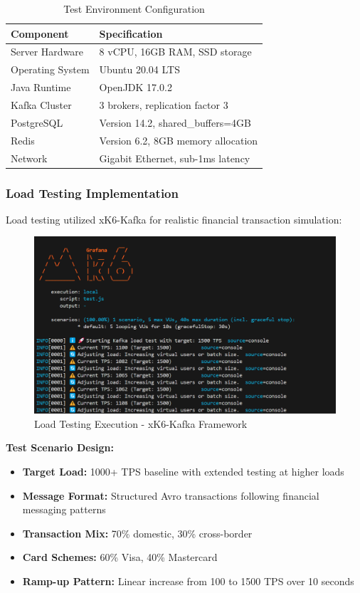 \begin{table}[h]
\centering
\begin{tabular}{|l|l|}
\hline
\textbf{Component} & \textbf{Specification} \\
\hline
Server Hardware & 8 vCPU, 16GB RAM, SSD storage \\
Operating System & Ubuntu 20.04 LTS \\
Java Runtime & OpenJDK 17.0.2 \\
Kafka Cluster & 3 brokers, replication factor 3 \\
PostgreSQL & Version 14.2, shared\_buffers=4GB \\
Redis & Version 6.2, 8GB memory allocation \\
Network & Gigabit Ethernet, sub-1ms latency \\
\hline
\end{tabular}
\caption{Test Environment Configuration}
\end{table}

\subsubsection{Load Testing Implementation}

Load testing utilized xK6-Kafka for realistic financial transaction simulation:

\begin{figure}[h]
    \centering
    \includegraphics[width=1\textwidth]{metrics/k6-kafka-load-test.png}
    \caption{Load Testing Execution - xK6-Kafka Framework}
    \label{fig:load-test-setup}
\end{figure}

\textbf{Test Scenario Design:}
\begin{itemize}
    \item \textbf{Target Load:} 1000+ TPS baseline with extended testing at higher loads
    \item \textbf{Message Format:} Structured Avro transactions following financial messaging patterns
    \item \textbf{Transaction Mix:} 70\% domestic, 30\% cross-border
    \item \textbf{Card Schemes:} 60\% Visa, 40\% Mastercard
    \item \textbf{Ramp-up Pattern:} Linear increase from 100 to 1500 TPS over 10 seconds
\end{itemize}

